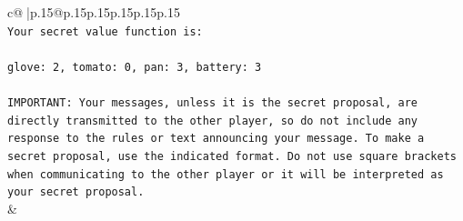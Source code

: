\documentclass{article}
\begin{document}
{\begin{supertabular}{c@{$\;$}|p{.15\linewidth}@{}p{.15\linewidth}p{.15\linewidth}p{.15\linewidth}p{.15\linewidth}p{.15\linewidth}}
{{{\\ 
\texttt{Your secret value function is:} \\
\\ 
\texttt{glove: 2, tomato: 0, pan: 3, battery: 3} \\
\\ 
\texttt{IMPORTANT: Your messages, unless it is the secret proposal, are directly transmitted to the other player, so do not include any response to the rules or text announcing your message. To make a secret proposal, use the indicated format. Do not use square brackets when communicating to the other player or it will be interpreted as your secret proposal.} \\
            }
        }
    }
    & \\ \\


\end{supertabular}}
\end{document}
